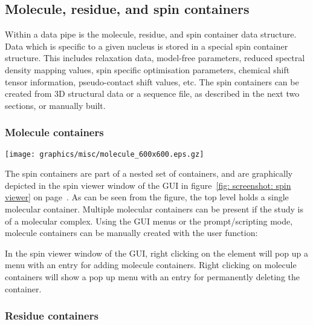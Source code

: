 
\subsection{Molecule, residue, and spin containers}

Within a data pipe is the molecule, residue, and spin container data structure.  Data which is specific to a given nucleus is stored in a special spin container structure.  This includes relaxation data, model-free parameters, reduced spectral density mapping values, spin specific optimisation parameters, chemical shift tensor information, pseudo-contact shift values, etc.  The spin containers can be created from 3D structural data or a sequence file, as described in the next two sections, or manually built.



\subsubsection{Molecule containers}

\begin{figure*}[h]
\texttt{[image: graphics/misc/molecule\_600x600.eps.gz]}
\end{figure*}

The spin containers are part of a nested set of containers, and are graphically depicted in the spin viewer window of the GUI in figure~\ref{fig: screenshot: spin viewer} on page~\pageref{fig: screenshot: spin viewer}.  As can be seen from the figure, the top level holds a single molecular container.  Multiple molecular containers can be present if the study is of a molecular complex.  Using the GUI menus or the prompt/scripting mode, molecule containers can be manually created with the user function:


In the spin viewer window of the GUI, right clicking on the  element will pop up a menu with an entry for adding molecule containers.  Right clicking on molecule containers will show a pop up menu with an entry for permanently deleting the container.



\subsubsection{Residue containers}

